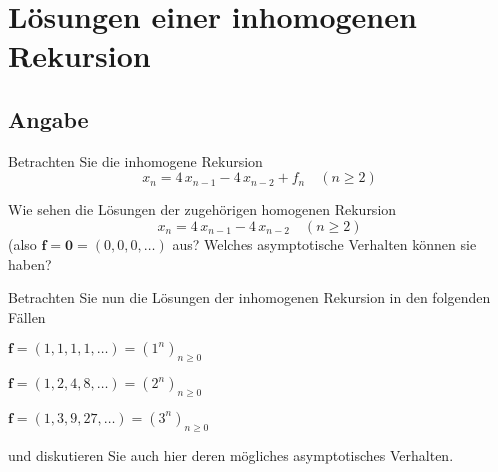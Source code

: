 \section*{Lösungen einer inhomogenen Rekursion}

\subsection*{Angabe}
Betrachten Sie die inhomogene Rekursion
\[
x_n = 4\, x_{n-1}- 4\, x_{n-2} +f_n \quad (n \geq 2)
\]
\begin{flushenum}
\item Wie sehen die Lösungen der zugehörigen homogenen Rekursion 
\[
x_n = 4\, x_{n-1}- 4\, x_{n-2} \quad (n \geq 2)
\]
(also $\boldsymbol{f}=\boldsymbol{0}=(0,0,0,\ldots)$ aus? 
Welches asymptotische Verhalten können sie haben?
\item Betrachten Sie nun die Lösungen der inhomogenen Rekursion in den
	folgenden Fällen
	\begin{flushalpha}
		\item $\boldsymbol{f} = (1,1,1,1,\ldots) = (1^n)_{n \geq 0}$
		\item $\boldsymbol{f} = (1,2,4,8, \ldots) = (2^n)_{n \geq 0}$
		\item $\boldsymbol{f} = (1,3,9,27, \ldots) = (3^n)_{n \geq 0}$
	\end{flushalpha} 
 und diskutieren Sie auch hier deren mögliches asymptotisches Verhalten.
 \end{flushenum}

